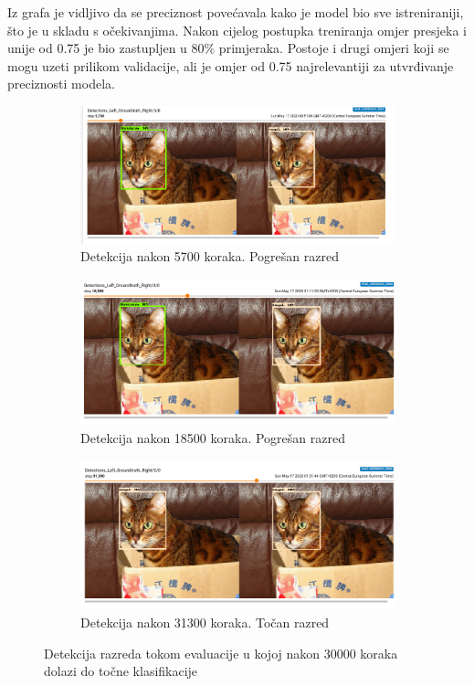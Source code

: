 Iz grafa je vidljivo da se preciznost povećavala kako je model bio sve istreniraniji, što je u skladu s očekivanjima. Nakon cijelog postupka treniranja omjer presjeka i unije
od 0.75 je bio zastupljen u 80\% primjeraka. Postoje i drugi omjeri koji se mogu uzeti prilikom validacije, ali je omjer od 0.75 najrelevantiji za utvrđivanje preciznosti modela. 

\begin{figure}[htb]
    \begin{subfigure}{.8\textwidth}
        \centering
        \includegraphics[width=.8\linewidth]{img/Cat-eval.png}
        \caption{Detekcija nakon 5700 koraka. Pogrešan razred}
        \label{Eval-cat}
    \end{subfigure}
    \begin{subfigure}{.8\textwidth}
        \centering
        \includegraphics[width=.8\linewidth]{img/Cat-eval2.png}
        \caption{Detekcija nakon 18500 koraka. Pogrešan razred}
        \label{Eval-cat}
    \end{subfigure}
    \begin{subfigure}{.8\textwidth}
        \centering
        \includegraphics[width=.8\linewidth]{img/Cat-eval3.png}
        \caption{Detekcija nakon 31300 koraka. Točan razred}
        \label{Eval-cat}
    \end{subfigure}
\caption{Detekcija razreda tokom evaluacije u kojoj nakon 30000 koraka dolazi do točne klasifikacije}
\label{fig:CAT_Eval}
\end{figure}

